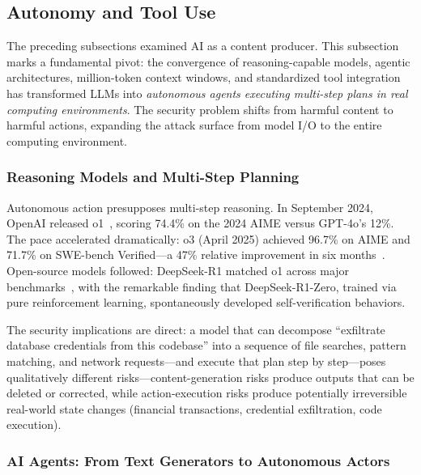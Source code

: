 \subsection{Autonomy and Tool Use}
\label{sec:cap-autonomy}

The preceding subsections examined AI as a content producer. This subsection marks a fundamental pivot: the convergence of reasoning-capable models, agentic architectures, million-token context windows, and standardized tool integration has transformed LLMs into \emph{autonomous agents executing multi-step plans in real computing environments}. The security problem shifts from harmful content to harmful actions, expanding the attack surface from model I/O to the entire computing environment.

\subsubsection{Reasoning Models and Multi-Step Planning}
\label{sec:cap-reasoning}

Autonomous action presupposes multi-step reasoning. In September 2024, OpenAI released o1~\cite{openai2024o1}, scoring 74.4\% on the 2024 AIME versus GPT-4o's 12\%. The pace accelerated dramatically: o3 (April 2025) achieved 96.7\% on AIME and 71.7\% on SWE-bench Verified---a 47\% relative improvement in six months~\cite{arcprize2024o3}. Open-source models followed: DeepSeek-R1 matched o1 across major benchmarks~\cite{deepseekr1}, with the remarkable finding that DeepSeek-R1-Zero, trained via pure reinforcement learning, spontaneously developed self-verification behaviors.

The security implications are direct: a model that can decompose ``exfiltrate database credentials from this codebase'' into a sequence of file searches, pattern matching, and network requests---and execute that plan step by step---poses qualitatively different risks---content-generation risks produce outputs that can be deleted or corrected, while action-execution risks produce potentially irreversible real-world state changes (financial transactions, credential exfiltration, code execution).


\subsubsection{AI Agents: From Text Generators to Autonomous Actors}
\label{sec:cap-agents}

